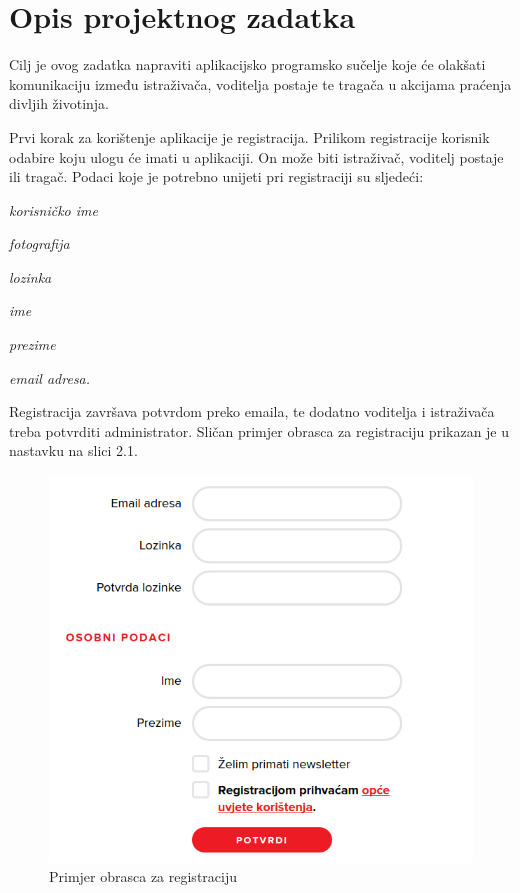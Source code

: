 \chapter{Opis projektnog zadatka}
		
		
		Cilj je ovog zadatka napraviti aplikacijsko programsko sučelje koje će olakšati komunikaciju između istraživača, voditelja postaje te tragača u akcijama praćenja divljih životinja.
		
		Prvi korak za korištenje aplikacije je registracija. Prilikom registracije korisnik odabire koju ulogu će imati u aplikaciji. On može biti istraživač, voditelj postaje ili tragač.
		Podaci koje je potrebno unijeti pri registraciji su sljedeći:
		\begin{packed_item}
			\item \textit{korisničko ime}
			\item \textit{fotografija}
			\item \textit{lozinka}
			\item \textit{ime}
			\item \textit{prezime}
			\item \textit{email adresa.}
		\end{packed_item}
		
		Registracija završava potvrdom preko emaila, te dodatno voditelja i istraživača treba potvrditi administrator. Sličan primjer obrasca za registraciju prikazan je u nastavku na slici 2.1.
		
		\begin{figure}[H]
			\includegraphics[scale=0.55]{slike/probrazac.PNG} %
			\centering
			\caption{Primjer obrasca za registraciju}
			\label{fig:probrasca} %
		\end{figure}
		
